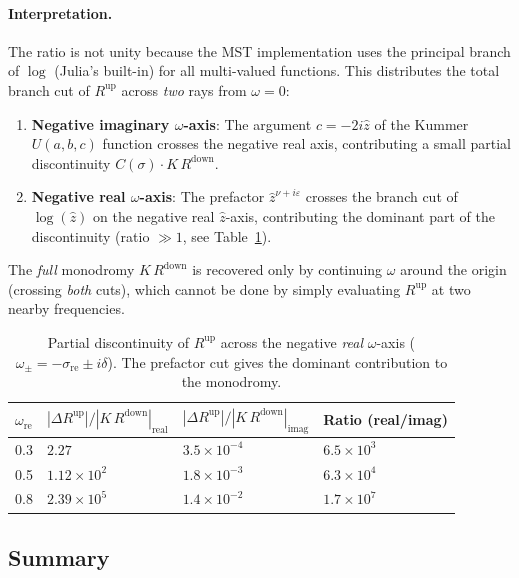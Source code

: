 \documentclass[12pt,a4paper]{article}
\newcommand{\Rup}{R^{\mathrm{up}}}
\newcommand{\Rdown}{R^{\mathrm{down}}}
\begin{document}
\paragraph{Interpretation.}
The ratio is not unity because the MST implementation uses the principal branch
of $\log$ (Julia's built-in) for all multi-valued functions.
This distributes the total branch cut of $\Rup$ across \emph{two} rays from $\omega = 0$:
\begin{enumerate}
  \item \textbf{Negative imaginary $\omega$-axis}: The argument $c = -2i\hat{z}$ of
    the Kummer $U(a,b,c)$ function crosses the negative real axis, contributing a
    small partial discontinuity $C(\sigma) \cdot K\,\Rdown$.
  \item \textbf{Negative real $\omega$-axis}: The prefactor $\hat{z}^{\nu + i\varepsilon}$
    crosses the branch cut of $\log(\hat{z})$ on the negative real $\hat{z}$-axis,
    contributing the dominant part of the discontinuity (ratio $\gg 1$, see
    Table~\ref{tab:branchcut_real}).
\end{enumerate}
The \emph{full} monodromy $K\,\Rdown$ is recovered only by continuing $\omega$ around the
origin (crossing \emph{both} cuts), which cannot be done by simply evaluating $\Rup$ at two
nearby frequencies.

\begin{table}[ht]
\centering
\caption{Partial discontinuity of $\Rup$ across the negative \emph{real} $\omega$-axis
($\omega_\pm = -\sigma_{\mathrm{re}} \pm i\delta$).
The prefactor cut gives the dominant contribution to the monodromy.}
\label{tab:branchcut_real}
\begin{tabular}{llll}
\toprule
$\omega_{\mathrm{re}}$ & $|\Delta \Rup|/|K\,\Rdown|_{\mathrm{real}}$
& $|\Delta \Rup|/|K\,\Rdown|_{\mathrm{imag}}$
& Ratio (real/imag) \\
\midrule
0.3 & $2.27$ & $3.5 \times 10^{-4}$ & $6.5 \times 10^{3}$ \\
0.5 & $1.12 \times 10^{2}$ & $1.8 \times 10^{-3}$ & $6.3 \times 10^{4}$ \\
0.8 & $2.39 \times 10^{5}$ & $1.4 \times 10^{-2}$ & $1.7 \times 10^{7}$ \\
\bottomrule
\end{tabular}
\end{table}

\subsection{Summary}
\end{document}
